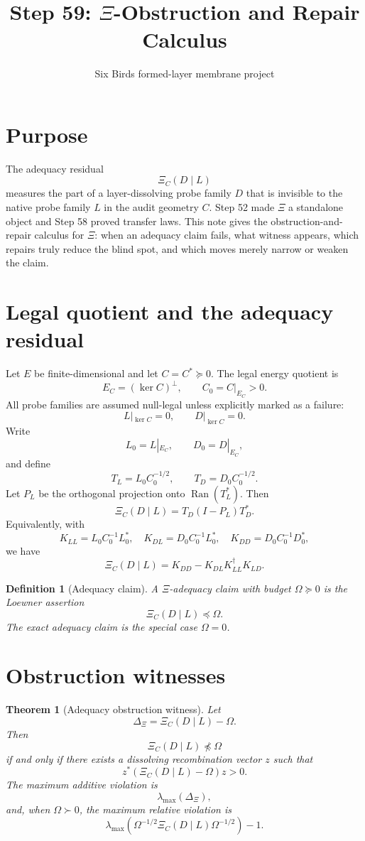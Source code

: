 \documentclass[11pt]{article}
\title{Step 59: $\Xi$-Obstruction and Repair Calculus}
\author{Six Birds formed-layer membrane project}
\date{}
\newtheorem{theorem}{Theorem}
\newtheorem{definition}{Definition}
\DeclareMathOperator{\Ran}{Ran}
\begin{document}
\maketitle

\section{Purpose}
The adequacy residual
\[
\Xi_C(D\mid L)
\]
measures the part of a layer-dissolving probe family $D$ that is invisible to the native probe family $L$ in the audit geometry $C$.  Step 52 made $\Xi$ a standalone object and Step 58 proved transfer laws.  This note gives the obstruction-and-repair calculus for $\Xi$: when an adequacy claim fails, what witness appears, which repairs truly reduce the blind spot, and which moves merely narrow or weaken the claim.

\section{Legal quotient and the adequacy residual}
Let $E$ be finite-dimensional and let $C=C^*\succeq0$.  The legal energy quotient is
\[
E_C=(\ker C)^\perp,
\qquad C_0=C|_{E_C}>0.
\]
All probe families are assumed null-legal unless explicitly marked as a failure:
\[
L|_{\ker C}=0,\qquad D|_{\ker C}=0.
\]
Write
\[
L_0=L|_{E_C},\qquad D_0=D|_{E_C},
\]
and define
\[
T_L=L_0 C_0^{-1/2},\qquad T_D=D_0 C_0^{-1/2}.
\]
Let $P_L$ be the orthogonal projection onto $\Ran(T_L^*)$.  Then
\[
\Xi_C(D\mid L)=T_D(I-P_L)T_D^*.
\]
Equivalently, with
\[
K_{LL}=L_0C_0^{-1}L_0^*,\quad
K_{DL}=D_0C_0^{-1}L_0^*,\quad
K_{DD}=D_0C_0^{-1}D_0^*,
\]
we have
\[
\boxed{\Xi_C(D\mid L)=K_{DD}-K_{DL}K_{LL}^{\dagger}K_{LD}.}
\]

\begin{definition}[Adequacy claim]
A $\Xi$-adequacy claim with budget $\Omega\succeq0$ is the Loewner assertion
\[
\Xi_C(D\mid L)\preceq\Omega.
\]
The exact adequacy claim is the special case $\Omega=0$.
\end{definition}

\section{Obstruction witnesses}
\begin{theorem}[Adequacy obstruction witness]
Let
\[
\Delta_\Xi=\Xi_C(D\mid L)-\Omega.
\]
Then
\[
\Xi_C(D\mid L)\npreceq\Omega
\]
if and only if there exists a dissolving recombination vector $z$ such that
\[
\boxed{z^*(\Xi_C(D\mid L)-\Omega)z>0.}
\]
The maximum additive violation is
\[
\lambda_{\max}(\Delta_\Xi),
\]
and, when $\Omega\succ0$, the maximum relative violation is
\[
\lambda_{\max}(\Omega^{-1/2}\Xi_C(D\mid L)\Omega^{-1/2})-1.
\]
\end{theorem}
\end{document}

